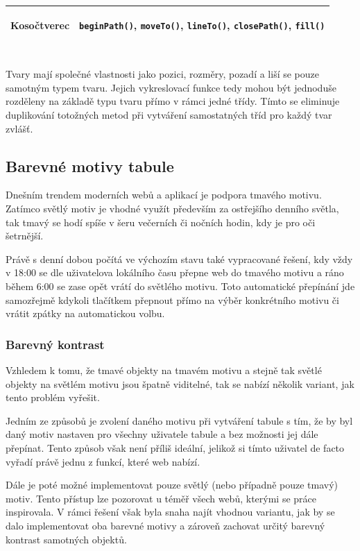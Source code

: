 \begin{sloppypar*}
\begin{description}
\begin{table}[h!]
\begin{tabular}{ll}
			Kosočtverec & \begin{sloppypar*}\texttt{beginPath()}, \texttt{moveTo()}, \texttt{lineTo()}, \texttt{closePath()}, \texttt{fill()}\end{sloppypar*}\\
			\bottomrule
		\end{tabular}
	\end{table}\\
	Tvary mají společné vlastnosti jako pozici, rozměry, pozadí a liší se pouze samotným typem tvaru.
	Jejich vykreslovací funkce tedy mohou být jednoduše rozděleny na základě typu tvaru přímo v rámci jedné třídy.
	Tímto se eliminuje duplikování totožných metod při vytváření samostatných tříd pro každý tvar zvlášť.
\end{description}
\end{sloppypar*}



\subsection{Barevné motivy tabule}
Dnešním trendem moderních webů a aplikací je podpora tmavého motivu.
Zatímco světlý motiv je vhodné využít především za ostřejšího denního světla, tak tmavý se hodí spíše v šeru večerních či nočních hodin, kdy je pro oči šetrnější.

Právě s denní dobou počítá ve výchozím stavu také vypracované řešení, kdy vždy v 18:00 se dle uživatelova lokálního času přepne web do tmavého motivu a ráno během 6:00 se zase opět vrátí do světlého motivu.
Toto automatické přepínání jde samozřejmě kdykoli tlačítkem přepnout přímo na výběr konkrétního motivu či vrátit zpátky na automatickou volbu.


\subsubsection{Barevný kontrast}
Vzhledem k tomu, že tmavé objekty na tmavém motivu a stejně tak světlé objekty na světlém motivu jsou špatně viditelné, tak se nabízí několik variant, jak tento problém vyřešit.

Jedním ze způsobů je zvolení daného motivu při vytváření tabule s tím, že by byl daný motiv nastaven pro všechny uživatele tabule a bez možnosti jej dále přepínat.
Tento způsob však není příliš ideální, jelikož si tímto uživatel de facto vyřadí právě jednu z funkcí, které web nabízí.

Dále je poté možné implementovat pouze světlý (nebo případně pouze tmavý) motiv.
Tento přístup lze pozorovat u téměř všech webů, kterými se práce inspirovala.
V rámci řešení však byla snaha najít vhodnou variantu, jak by se dalo implementovat oba barevné motivy a zároveň zachovat určitý barevný kontrast samotných objektů.

